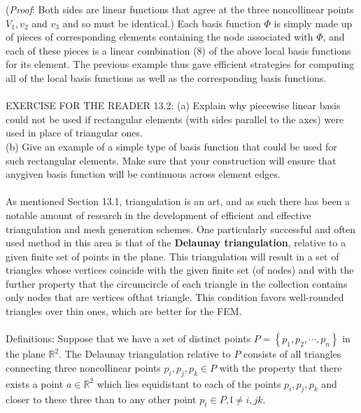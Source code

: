\documentclass[../main.tex]{subfiles}
\begin{document}
(\textit{Proof}: Both sides are linear functions that agree at the three noncollinear points $V_1,v_2$ and $v_3$ and so must be identical.) Each basis function $\Phi$ is simply made up of pieces of corresponding elements containing the node associated with $\Phi$, and each of these pieces is a linear combination (8) of the above local basis functions for its element. The previous example thus gave efficient strategies for computing all of the local basis functions as well as the corresponding basis functions.
\\
\\
EXERCISE FOR THE READER 13.2: (a) Explain why piecewise linear basis 
 could not be used if rectangular elements (with sides parallel to the axes) were used in place of triangular ones. 
\\
(b) Give an example of a simple type of basis function that could be used for such rectangular elements. Make sure that your construction will ensure that anygiven basis function will be continuous across element edges.
\\
\\
As mentioned Section 13.1, triangulation is an art, and as such there has been a notable amount of research in the development of efficient and effective triangulation and mesh generation schemes. One particularly successful and often used method in this area is that of the \textbf{Delaunay triangulation}, relative to a given finite set of points in the plane. This triangulation will result in a set of triangles whose vertices coincide with the given finite set (of nodes) and with the further property that the circumcircle of each triangle in the collection contains only nodes that are vertices ofthat triangle. This condition favors well-rounded triangles over thin ones, which are better for the FEM.
\\
\\
Definitions: Suppose that we have a set of distinct points $P=\left\{ p_1,p_2, \cdots,p_n \right\}$ in the plane $ \mathbb{R}^2$. The Delaunay triangulation relative to $P$ consists of all triangles connecting three noncollinear points $p_i,p_j,p_k \in P$ with the property that there exists a point $a \in \mathbb{R}^2$ which lies equidistant to each of the points $p_i,p_j,p_k$ and closer to these three than to any other point $p_t \in P,\mathfrak{l} \neq i, j k$. 
\\
\end{document}

